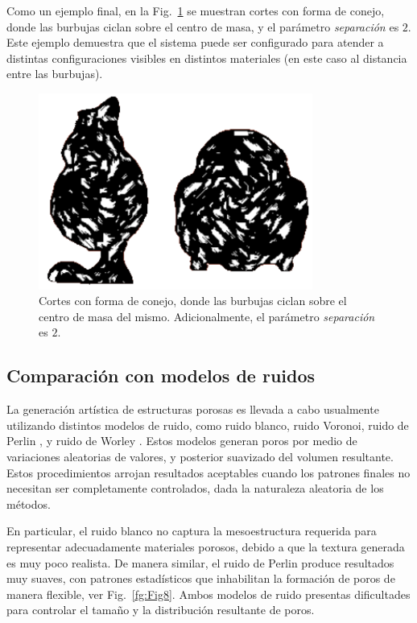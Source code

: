 Como un ejemplo final, en la Fig.~\ref{fg:Fig7} se muestran cortes con forma de conejo, donde las burbujas ciclan sobre el centro de masa, y el parámetro {\em separación} es $2$.
Este ejemplo demuestra que el sistema puede ser configurado para atender a distintas configuraciones visibles en distintos materiales (en este caso al distancia entre las burbujas).


\begin{figure}
  \centerline{\includegraphics[width=9cm]{figures/Fig7}}
  \caption{Cortes con forma de conejo, donde las burbujas ciclan sobre el centro de masa del mismo. Adicionalmente, el parámetro {\em separación} es $2$.}
  \label{fg:Fig7}
\end{figure}

\subsection{Comparación con modelos de ruidos}
La generación artística de estructuras porosas es llevada a cabo usualmente utilizando distintos modelos de ruido, como ruido blanco, ruido Voronoi, ruido de Perlin \cite{Perlin1985}, y ruido de Worley \cite{Worley1996}.
Estos modelos generan poros por medio de variaciones aleatorias de valores, y posterior suavizado del volumen resultante.
Estos procedimientos arrojan resultados aceptables cuando los patrones finales no necesitan ser completamente controlados, dada la naturaleza aleatoria de los métodos.

En particular, el ruido blanco no captura la mesoestructura requerida para representar adecuadamente materiales porosos, debido a que la textura generada es muy poco realista.
De manera similar, el ruido de Perlin produce resultados muy suaves, con patrones estadísticos que inhabilitan la formación de poros de manera flexible, ver Fig.~\ref{fg:Fig8}.
Ambos modelos de ruido presentas dificultades para controlar el tamaño y la distribución resultante de poros.

